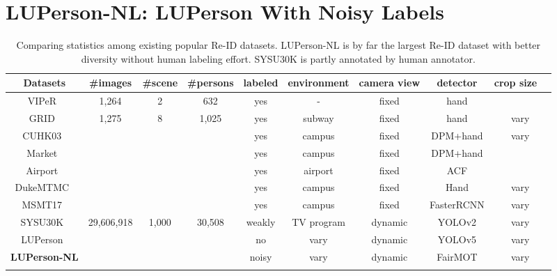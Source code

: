 \documentclass[10pt,twocolumn,letterpaper]{article}
\begin{document}
\vspace{-0.3em}
\section{LUPerson-NL: LUPerson With Noisy Labels}
\label{sec:lup-nl}
\vspace{-0.2em}

\begin{table*}[t]
    \centering
    \small
    \setlength\tabcolsep{4.5pt}
    \begin{tabular}{c|c|c|c|c|c|c|c|c}
    \shline
        Datasets & \#images & \#scene & \#persons & labeled & environment & camera view  & detector & crop size \ \\
        \hline
        VIPeR~\cite{gray2008viewpoint} & 1,264 & 2 & 632 & yes & - & fixed  & hand &  \\
        GRID~\cite{loy2013person} & 1,275 & 8 & 1,025 & yes & subway & fixed & hand & vary \\
        CUHK03~\cite{li2014deepreid} &  &  &  & yes & campus & fixed & DPM\cite{felzenszwalb2009object}+hand & vary\\
        Market~\cite{Zheng2015ScalablePR} &  &  &  & yes & campus & fixed & DPM\cite{felzenszwalb2009object}+hand &  \\
        Airport~\cite{karanam2016comprehensive} &  &  &  & yes & airport & fixed & ACF\cite{dollar2014fast} &  \\
        DukeMTMC~\cite{zheng2017unlabeled} &  &  &  & yes & campus & fixed & Hand &  vary \\
        MSMT17~\cite{wei2018person} &  &  &  & yes & campus & fixed & FasterRCNN\cite{ren2015faster} & vary \\
        SYSU30K~\cite{wang2020weakly} & 29,606,918 & 1,000 & 30,508 & weakly & TV program & dynamic & YOLOv2 & vary \\
        LUPerson~\cite{fu2020unsupervised} &  &  &  & no & vary & dynamic & YOLOv5 & vary \\
        \hline
        \textbf{LUPerson-NL} &  &  &  & noisy & vary & dynamic & FairMOT\cite{zhang2020fairmot} & vary \\
        \shline
    \end{tabular}
\caption{Comparing statistics among existing popular Re-ID datasets. LUPerson-NL is by far the largest Re-ID dataset with better diversity without human labeling effort. SYSU30K is partly annotated by human annotator.}
    \label{tab:data-stat}
\end{table*}
\end{document}
